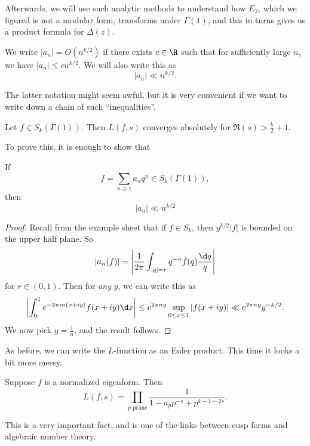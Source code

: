 \documentclass[a4paper]{article}
\begin{document}
Afterwards, we will use such analytic methods to understand how $E_2$, which we figured is not a modular form, transforms under $\Gamma(1)$, and this in turns gives us a product formula for $\Delta(z)$.

\begin{notation}
  We write $|a_n| = O(n^{k/2})$ if there exists $c \in \R$ such that for sufficiently large $n$, we have $|a_n| \leq c n^{k/2}$. We will also write this as
  \[
    |a_n| \ll n^{k/2}.
  \]
\end{notation}
The latter notation might seem awful, but it is very convenient if we want to write down a chain of such ``inequalities''.

\begin{prop}
  Let $f \in S_k(\Gamma(1))$. Then $L(f, s)$ converges absolutely for $\Re(s) > \frac{k}{2} + 1$.
\end{prop}

To prove this, it is enough to show that
\begin{lemma}
  If
  \[
    f = \sum_{n \geq 1} a_n q^n \in S_k(\Gamma(1)),
  \]
  then
  \[
    |a_n| \ll n^{k/2}
  \]
\end{lemma}

\begin{proof}
  Recall from the example sheet that if $f \in S_k$, then $y^{k/2} |f|$ is bounded on the upper half plane. So
  \[
    |a_n(f)| = \left|\frac{1}{2\pi} \int_{|q| = r} q^{-n} \tilde{f}(q) \frac{\d q}{q}\right|
  \]
  for $r \in (0, 1)$. Then for \emph{any} $y$, we can write this as
  \[
    \left|\int_0^1 e^{-2\pi i n(x + iy)} f(x + iy) \d x\right| \leq e^{2\pi n y}\sup_{0 \leq x \leq 1} |f(x + iy)| \ll e^{2\pi n y} y^{-k/2}.
  \]
  We now pick $y = \frac{1}{n}$, and the result follows.
\end{proof}

As before, we can write the $L$-function as an Euler product. This time it looks a bit more messy.

\begin{prop}
  Suppose $f$ is a normalized eigenform. Then
  \[
    L(f, s) = \prod_{p\text{ prime}} \frac{1}{1 - a_p p^{-s} + p^{k - 1 - 2s}}.
  \]
\end{prop}
This is a very important fact, and is one of the links between cusp forms and algebraic number theory.
\end{document}
